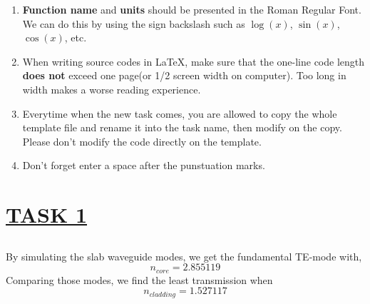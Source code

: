 \documentclass[fontsize=11pt]{scrartcl}
\begin{document}
\begin{enumerate}
    \item  \textbf{Function name} and \textbf{units} should be presented in the Roman Regular Font.
    We can do this by using the sign backslash such as $\log(x)$, $\sin(x)$, $\cos(x)$, etc.
    \item When writing source codes in \LaTeX, make sure that the one-line code length 
    \textbf{does not} exceed one page(or 1/2 screen width on computer). Too long in width makes 
    a worse reading experience.
    \item Everytime when the new task comes, you are allowed to copy the whole template file and 
    rename it into the task name, then modify on the copy. Please don't modify the code directly
    on the template.
    \item Don't forget enter a space after the punstuation marks.
\end{enumerate}



\pagebreak
\section{\uline{TASK 1}}
\subsection{}
By simulating the slab waveguide modes, we get the fundamental TE-mode with,
\begin{equation} 
    n_{core}=2.855119 
    \label{eq1}
\end{equation}
Comparing those modes, we find the least transmission when
\begin{equation} 
    n_{cladding}=1.527117 
    \label{eq2}
\end{equation}
\end{document}
